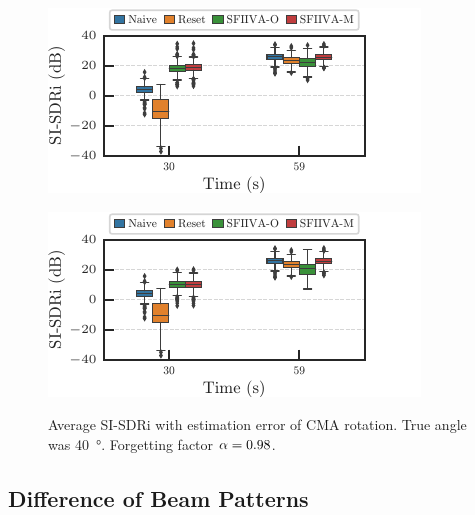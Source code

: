 \documentclass[sip,biber]{now-journal}
\begin{document}
\begin{figure}[t]
  \begin{minipage}[t]{.45\textwidth}
    \centering\includegraphics{figures/plots/online/box_980.pdf}\label{fig:plot:box:980}
  \end{minipage}
  \begin{minipage}[t]{.45\textwidth}
    \centering\includegraphics{figures/plots/online/box_980_err.pdf}\label{fig:plot:box:980:deg60}
  \end{minipage}
  \caption{Average SI-SDRi with estimation error of CMA rotation. True angle was \SI{40}{\degree}. Forgetting factor $\alpha = 0.98$.}%
  \label{fig:plot:box:err}
\end{figure}

\subsection{Difference of Beam Patterns}
\end{document}
